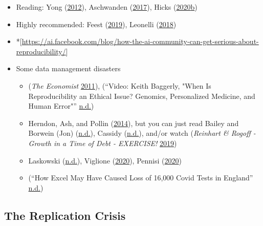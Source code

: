 \documentclass[
]{article}
\providecommand{\tightlist}{%
  \setlength{\itemsep}{0pt}\setlength{\parskip}{0pt}}
\begin{document}
\begin{itemize}
\item
  Reading: Yong (\protect\hyperlink{ref-YongReplicationStudiesBad2012}{2012}), Aschwanden (\protect\hyperlink{ref-AschwandenThereNoSuch2017}{2017}), Hicks (\protect\hyperlink{ref-HicksCommentSubmittedDaniel2020}{2020}\protect\hyperlink{ref-HicksCommentSubmittedDaniel2020}{b})
\item
  Highly recommended: Feest (\protect\hyperlink{ref-FeestWhyReplicationOverrated2019}{2019}), Leonelli (\protect\hyperlink{ref-LeonelliRethinkingReproducibilityCriterion2018}{2018})
\item
  *{[}\url{https://ai.facebook.com/blog/how-the-ai-community-can-get-serious-about-reproducibility/}{]}
\item
  Some data management disasters

  \begin{itemize}
  \tightlist
  \item
    (\emph{The Economist} \protect\hyperlink{ref-ArrayErrors2011}{2011}), (``Video: Keith Baggerly, "When Is Reproducibility an Ethical Issue? Genomics, Personalized Medicine, and Human Error"'' \protect\hyperlink{ref-VideoKeithBaggerly}{n.d.})
  \item
    Herndon, Ash, and Pollin (\protect\hyperlink{ref-HerndonDoesHighPublic2014}{2014}), but you can just read Bailey and Borwein (Jon) (\protect\hyperlink{ref-BaileyReinhartRogoffErrorHow}{n.d.}), Cassidy (\protect\hyperlink{ref-CassidyReinhartRogoffControversy}{n.d.}), and/or watch (\emph{Reinhart \& Rogoff - Growth in a Time of Debt - EXERCISE!} \protect\hyperlink{ref-ReinhartRogoffGrowth2019}{2019})
  \item
    Laskowski (\protect\hyperlink{ref-LaskowskiWhatWhenYou}{n.d.}), Viglione (\protect\hyperlink{ref-ViglioneAvalancheSpiderpaperRetractions2020}{2020}), Pennisi (\protect\hyperlink{ref-PennisiProminentSpiderBiologist2020}{2020})
  \item
    (``How Excel May Have Caused Loss of 16,000 Covid Tests in England'' \protect\hyperlink{ref-HowExcelMay2020}{n.d.})
  \end{itemize}
\end{itemize}

\hypertarget{the-replication-crisis}{%
\subsection{The Replication Crisis}\label{the-replication-crisis}}
\end{document}
